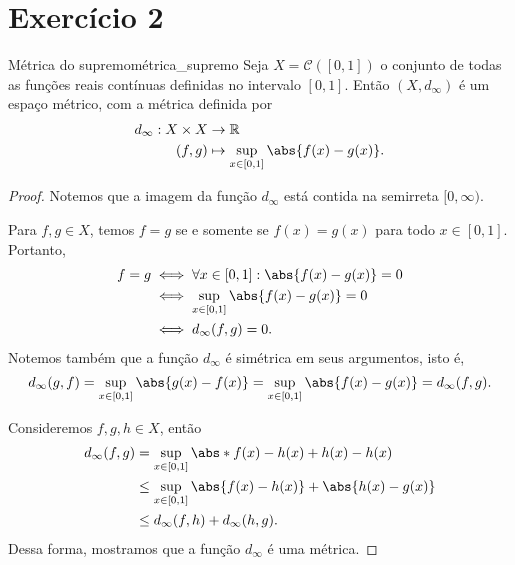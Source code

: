 \section*{Exercício 2}
\begin{proposition}{Métrica do supremo}{métrica_supremo}
    Seja \(X = \mathcal{C}([0,1])\) o conjunto de todas as funções reais contínuas definidas no intervalo \([0,1]\). Então \((X, d_\infty)\) é um espaço métrico, com a métrica definida por
    \begin{align*}
        d_\infty : X \times X &\to \mathbb{R}\\
                        (f,g) &\mapsto \sup_{x \in [0,1]} \abs{f(x) - g(x)}.
    \end{align*}
\end{proposition}
\begin{proof}
    Notemos que a imagem da função \(d_\infty\) está contida na semirreta \([0,\infty)\).

    Para \(f,g \in X\), temos \(f = g\) se e somente se \(f(x) = g(x)\) para todo \(x \in [0,1]\). Portanto,
    \begin{align*}
        f = g &\iff \forall x \in [0,1] : \abs{f(x) - g(x)} = 0\\
              &\iff \sup_{x \in [0,1]}  \abs{f(x) - g(x)} = 0\\
              &\iff d_\infty(f,g) = 0.
    \end{align*}
    Notemos também que a função \(d_\infty\) é simétrica em seus argumentos, isto é,
    \begin{equation*}
        d_\infty(g,f) = \sup_{x\in[0,1]}\abs{g(x) - f(x)} = \sup_{x\in[0,1]} \abs{f(x) - g(x)} = d_\infty(f,g).
    \end{equation*}

    Consideremos \(f,g,h \in X\), então
    \begin{align*}
        d_\infty(f,g) &= \sup_{x\in[0,1]}\abs*{f(x) - h(x) + h(x) - h(x)}\\\
                      &\leq \sup_{x\in[0,1]} \abs{f(x) - h(x)} + \abs{h(x) - g(x)}\\
                      &\leq d_\infty(f,h) + d_\infty(h,g).
    \end{align*}
    Dessa forma, mostramos que a função \(d_\infty\) é uma métrica.
\end{proof}
